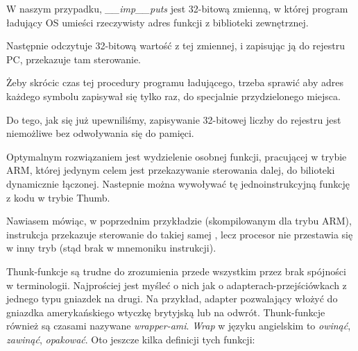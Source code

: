 W naszym przypadku, \emph{\_\_imp\_\_puts} jest 32-bitową zmienną, w której program ładujący \ac{OS} umieści rzeczywisty adres funkcji z biblioteki zewnętrznej.

Następnie  odczytuje 32-bitową wartość z tej zmiennej, i zapisując ją do rejestru \ac{PC}, przekazuje tam sterowanie.

Żeby skrócic czas tej procedury programu ładującego, trzeba sprawić aby adres każdego symbolu zapisywał się tylko raz, do specjalnie przydzielonego miejsca.

Do tego, jak się już upewniliśmy, zapisywanie 32-bitowej liczby do rejestru jest niemożliwe bez odwoływania się do pamięci.

Optymalnym rozwiązaniem jest wydzielenie osobnej funkcji, pracującej w trybie ARM,
której jedynym celem jest przekazywanie sterowania dalej, do bilioteki dynamicznie łączonej. Nastepnie można wywoływać tę jednoinstrukcyjną funkcję z kodu w trybie Thumb.

Nawiasem mówiąc, w poprzednim przykładzie (skompilowanym dla trybu ARM), instrukcja  przekazuje sterowanie do takiej samej , lecz procesor nie przestawia się w inny tryb (stąd brak  w mnemoniku instrukcji).


Thunk-funkcje są trudne do zrozumienia przede wszystkim przez brak spójności w terminologii.
Najprościej jest myśleć o nich jak o adapterach-przejściówkach z jednego typu gniazdek na drugi.
Na przykład, adapter pozwalający włożyć do gniazdka amerykańskiego wtyczkę brytyjską lub na odwrót. Thunk-funkcje również są czasami nazywane \emph{wrapper-ami}. \emph{Wrap} w języku angielskim to \emph{owinąć}, \emph{zawinąć}, \emph{opakować}.
Oto jeszcze kilka definicji tych funkcji:

